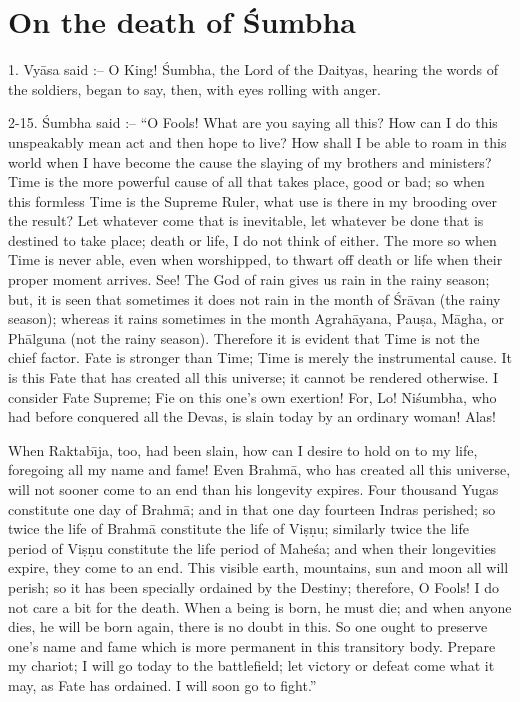 \chapter{On the death of \'Sumbha}

1. Vy\=asa said :-- O King! \'Sumbha, the Lord of the Daityas, hearing the words of the soldiers, began to say, then, with eyes rolling with anger.

2-15. \'Sumbha said :-- ``O Fools! What are you saying all this? How can I do this unspeakably mean act and then hope to live? How shall I be able to roam in this world when I have become the cause the slaying of my brothers and ministers? Time is the more powerful cause of all that takes place, good or bad; so when this formless Time is the Supreme Ruler, what use is there in my brooding over the result? Let whatever come that is inevitable, let whatever be done that is destined to take place; death or life, I do not think of either. The more so when Time is never able, even when worshipped, to thwart off death or life when their proper moment arrives. See! The God of rain gives us rain in the rainy season; but, it is seen that sometimes it does not rain in the month of \'Sr\=avan (the rainy season); whereas it rains sometimes in the month Agrah\=ayana, Pau\d{s}a, M\=agha, or Ph\=alguna (not the rainy season). Therefore it is evident that Time is not the chief factor. Fate is stronger than Time; Time is merely the instrumental cause. It is this Fate that has created all this universe; it cannot be rendered otherwise. I consider Fate Supreme; Fie on this one's own exertion! For, Lo! Ni\'sumbha, who had before conquered all the Devas, is slain today by an ordinary woman! Alas!

When Raktab\={\i}ja, too, had been slain, how can I desire to hold on to my life, foregoing all my name and fame! Even Brahm\=a, who has created all this universe, will not sooner come to an end than his longevity expires. Four thousand Yugas constitute one day of Brahm\=a; and in that one day fourteen Indras perished; so twice the life of Brahm\=a constitute the life of Vi\d{s}\d{n}u; similarly twice the life period of Vi\d{s}\d{n}u constitute the life period of Mahe\'sa; and when their longevities expire, they come to an end. This visible earth, mountains, sun and moon all will perish; so it has been specially ordained by the Destiny; therefore, O Fools! I do not care a bit for the death. When a being is born, he must die; and when anyone dies, he will be born again, there is no doubt in this. So one ought to preserve one's name and fame which is more permanent in this transitory body. Prepare my chariot; I will go today to the battlefield; let victory or defeat come what it may, as Fate has ordained. I will soon go to fight.''

